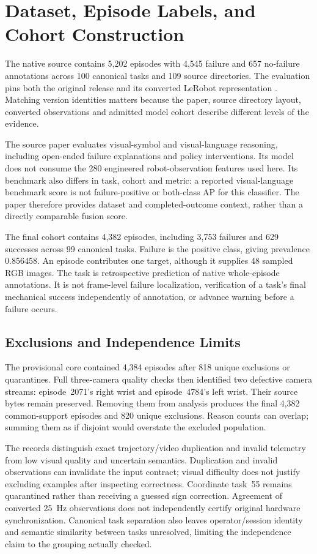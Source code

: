 \section{Dataset, Episode Labels, and Cohort Construction}
The native source contains 5,202 episodes with 4,545 failure and 657 no-failure
annotations across 100 canonical tasks and 109 source directories. The evaluation pins
both the original release and its converted LeRobot representation
\citep{ViFailbackHF2025}. Matching version identities matters because the paper, source
directory layout, converted observations and admitted model cohort describe different
levels of the evidence.

The source paper evaluates visual-symbol and visual-language reasoning, including
open-ended failure explanations and policy interventions. Its model does not consume the
280 engineered robot-observation features used here. Its benchmark also differs in task,
cohort and metric: a reported visual-language benchmark score is not failure-positive or
both-class AP for this classifier. The paper therefore provides dataset and
completed-outcome context, rather than a directly comparable fusion score.

The final cohort contains 4,382 episodes, including 3,753 failures and 629 successes
across 99 canonical tasks. Failure is the positive class, giving prevalence 0.856458. An
episode contributes one target, although it supplies 48 sampled RGB images. The task is
retrospective prediction of native whole-episode annotations. It is not frame-level
failure localization, verification of a task's final mechanical success independently of
annotation, or advance warning before a failure occurs.

\subsection{Exclusions and Independence Limits}
The provisional core contained 4,384 episodes after 818 unique exclusions or
quarantines. Full three-camera quality checks then identified two defective camera
streams: episode~2071's right wrist and episode~4784's left wrist. Their source bytes
remain preserved. Removing them from analysis produces the final 4,382 common-support
episodes and 820 unique exclusions. Reason counts can overlap; summing them as if
disjoint would overstate the excluded population.

The records distinguish exact trajectory/video duplication and invalid telemetry from
low visual quality and uncertain semantics. Duplication and invalid observations can
invalidate the input contract; visual difficulty does not justify excluding examples
after inspecting correctness. Coordinate task~55 remains quarantined rather than
receiving a guessed sign correction. Agreement of converted 25~Hz observations does not
independently certify original hardware synchronization. Canonical task separation also
leaves operator/session identity and semantic similarity between tasks unresolved,
limiting the independence claim to the grouping actually checked.

